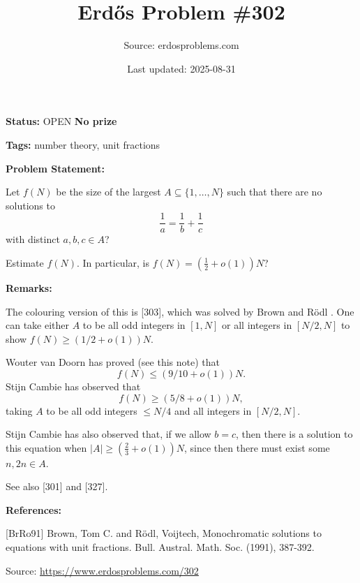 \documentclass{article}
\title{Erd\H{o}s Problem \#302}
\date{Last updated: 2025-08-31}
\author{Source: erdosproblems.com}
\begin{document}
\maketitle

\noindent\textbf{Status:} OPEN \quad \textbf{No prize}

\noindent\textbf{Tags:} number theory, unit fractions

\medskip
\noindent\textbf{Problem Statement:}

Let $f(N)$ be the size of the largest $A\subseteq \{1,\ldots,N\}$ such that there are no solutions to\[\frac{1}{a}= \frac{1}{b}+\frac{1}{c}\]with distinct $a,b,c\in A$?

Estimate $f(N)$. In particular, is $f(N)=(\tfrac{1}{2}+o(1))N$?

\bigskip
\noindent\textbf{Remarks:}

The colouring version of this is [303], which was solved by Brown and R\"{o}dl \cite{BrRo91}. One can take either $A$ to be all odd integers in $[1,N]$ or all integers in $[N/2,N]$ to show $f(N)\geq (1/2+o(1))N$.

Wouter van Doorn has proved (see this note) that\[f(N) \leq (9/10+o(1))N.\]Stijn Cambie has observed that\[f(N)\geq (5/8+o(1))N,\]taking $A$ to be all odd integers $\leq N/4$ and all integers in $[N/2,N]$.

Stijn Cambie has also observed that, if we allow $b=c$, then there is a solution to this equation when $\lvert A\rvert \geq (\tfrac{2}{3}+o(1))N$, since then there must exist some $n,2n\in A$.

See also [301] and [327].

\bigskip
\noindent\textbf{References:}

[BrRo91] Brown, Tom C. and R\"{o}dl, Voijtech, Monochromatic solutions to equations with unit fractions. Bull. Austral. Math. Soc. (1991), 387-392.

\bigskip
\noindent\small{Source: \url{https://www.erdosproblems.com/302}}
\end{document}
